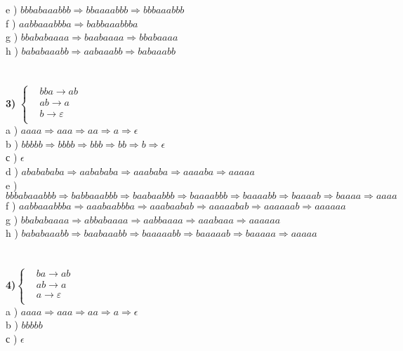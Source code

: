 \documentclass[a4paper,14pt]{article}
\begin{document}
e ) $bbbabaaabbb\Rightarrow bbaaaabbb\Rightarrow bbbaaabbb$\\
f ) $aabbaaabbba\Rightarrow babbaaabbba$\\
g ) $bbababaaaa\Rightarrow baabaaaa\Rightarrow bbabaaaa$\\
h ) $bababaaabb\Rightarrow aabaaabb\Rightarrow babaaabb$\\
\\\\
\textbf{3)}
$ \left\{
\begin{aligned}
&bba \rightarrow ab \\
&ab \rightarrow a \\
&b \rightarrow \varepsilon \\
\end{aligned}
\right.$
\\
a ) $aaaa\Rightarrow aaa\Rightarrow aa\Rightarrow a \Rightarrow \epsilon$\\
b ) $bbbbb\Rightarrow bbbb\Rightarrow bbb\Rightarrow bb\Rightarrow b\Rightarrow\epsilon$\\
с ) $\epsilon$\\
d ) $ababababa\Rightarrow aabababa\Rightarrow aaababa\Rightarrow aaaaba\Rightarrow aaaaa$\\
e ) $bbbabaaabbb\Rightarrow babbaaabbb\Rightarrow baabaabbb\Rightarrow baaaabbb\Rightarrow baaaabb\Rightarrow baaaab\Rightarrow baaaa\Rightarrow aaaa$\\
f ) $aabbaaabbba\Rightarrow aaabaabbba\Rightarrow aaabaabab\Rightarrow aaaaabab\Rightarrow aaaaaab\Rightarrow aaaaaa$\\
g ) $bbababaaaa\Rightarrow abbabaaaa\Rightarrow aabbaaaa\Rightarrow aaabaaa\Rightarrow aaaaaa$\\
h ) $bababaaabb\Rightarrow baabaaabb\Rightarrow baaaaabb\Rightarrow baaaaab\Rightarrow baaaaa\Rightarrow aaaaa$\\
\\\\
\textbf{4)}$ \left\{
\begin{aligned}
&ba \rightarrow ab \\
&ab \rightarrow a \\
&a \rightarrow \varepsilon \\
\end{aligned}
\right.$
\\
a ) $aaaa\Rightarrow aaa\Rightarrow aa\Rightarrow a\Rightarrow \epsilon$\\
b ) $bbbbb$\\
с ) $\epsilon$\\
\end{document}
